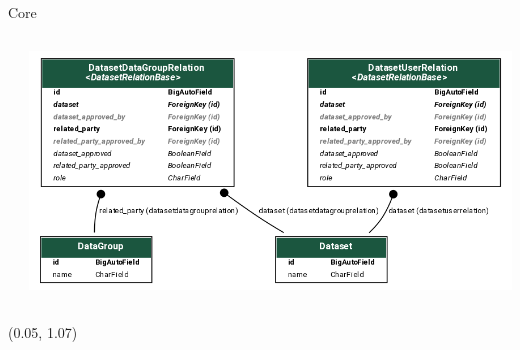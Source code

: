 \begin{frame}{Core}
\begin{columns}[T]
\begin{column}{0.4\textwidth}
        \end{column}
        \begin{column}{0.55\textwidth}
            \includegraphics[width=\textwidth]{figures/dataset-datagroup.png}
        \end{column}

    \end{columns}

    \begin{textblock*}{\textwidth}(0.05\linewidth, 1.07\textheight)
		\slidebuttons
	\end{textblock*}

\end{frame}

